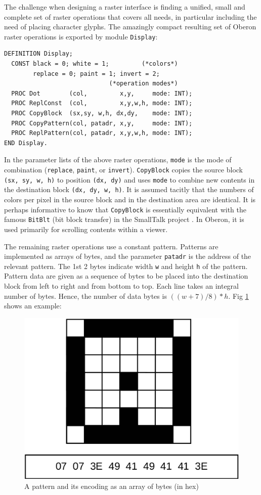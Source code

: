 The challenge when designing a raster interface is finding a unified, small and complete set
of raster operations that covers all needs, in particular including the need of placing
character glyphs. The amazingly compact resulting set of Oberon raster operations
is exported by module \verb|Display|:
\begin{verbatim}
DEFINITION Display;
  CONST black = 0; white = 1;         (*colors*)
        replace = 0; paint = 1; invert = 2;
                             (*operation modes*)
  PROC Dot        (col,         x,y,     mode: INT);
  PROC ReplConst  (col,         x,y,w,h, mode: INT);
  PROC CopyBlock  (sx,sy, w,h, dx,dy,    mode: INT);
  PROC CopyPattern(col, patadr, x,y,     mode: INT);
  PROC ReplPattern(col, patadr, x,y,w,h, mode: INT);
END Display.
\end{verbatim}
In the parameter lists of the above raster operations,
\verb|mode| is the mode of combination (\verb|replace|, \verb|paint|, or \verb|invert|).
\verb|CopyBlock| copies the source block \verb|(sx, sy, w, h)| to position \verb|(dx, dy)|
and uses \verb|mode| to combine new contents in the destination block \verb|(dx, dy, w, h)|.
It is assumed tacitly that the numbers of colors per pixel
in the source block and in the destination area are identical.
It is perhaps informative to know that \verb|CopyBlock| is essentially equivalent
with the famous \verb|BitBlt| (bit block transfer) in the SmallTalk project \cite{Goldberg}.
In Oberon, it is used primarily for scrolling contents within a viewer.

The remaining raster operations use a constant pattern.
Patterns are implemented as arrays of bytes, and the parameter
\verb|patadr| is the address of the relevant pattern.
The 1st 2 bytes indicate width \verb|w| and height \verb|h| of the pattern.
Pattern data are given as a sequence of bytes to be placed into the destination block
from left to right and from bottom to top. Each line takes an integral number of bytes.
Hence, the number of data bytes is $((w+7) / 8) * h$. Fig \ref{fig:pattern} shows an example:
\begin{figure}[h!]
  \centering
  \includegraphics[width=.6\textwidth]{i/b}
  \caption{A pattern and its encoding as an array of bytes (in hex)}
  \label{fig:pattern}
\end{figure}

